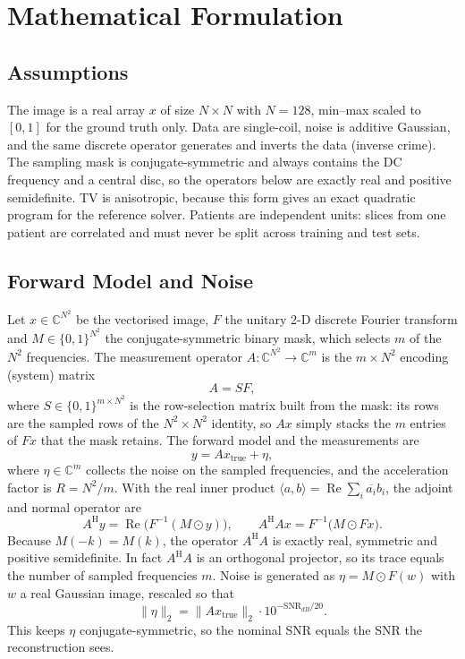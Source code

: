 \documentclass[conference,a4paper]{IEEEtran}
\newcommand{\AH}{A^{\mathrm{H}}}
\begin{document}
\section{Mathematical Formulation}

\subsection{Assumptions}
The image is a real array $x$ of size $N\times N$ with $N=128$, min--max scaled to $[0,1]$ for the ground truth only. Data are single-coil, noise is additive Gaussian, and the same discrete operator generates and inverts the data (inverse crime). The sampling mask is conjugate-symmetric and always contains the DC frequency and a central disc, so the operators below are exactly real and positive semidefinite. TV is anisotropic, because this form gives an exact quadratic program for the reference solver. Patients are independent units: slices from one patient are correlated and must never be split across training and test sets.

\subsection{Forward Model and Noise}\label{sec:forward}
Let $x\in\mathbb{C}^{N^2}$ be the vectorised image, $F$ the unitary 2-D discrete Fourier transform and $M\in\{0,1\}^{N^2}$ the conjugate-symmetric binary mask, which selects $m$ of the $N^2$ frequencies. The measurement operator $A:\mathbb{C}^{N^2}\to\mathbb{C}^{m}$ is the $m\times N^2$ encoding (system) matrix
\begin{equation}
A = S F ,
\end{equation}
where $S\in\{0,1\}^{m\times N^2}$ is the row-selection matrix built from the mask: its rows are the sampled rows of the $N^2\times N^2$ identity, so $Ax$ simply stacks the $m$ entries of $Fx$ that the mask retains. The forward model and the measurements are
\begin{equation}
y = Ax_{\mathrm{true}}+\eta ,
\end{equation}
where $\eta\in\mathbb{C}^{m}$ collects the noise on the sampled frequencies, and the acceleration factor is $R=N^2/m$. With the real inner product $\langle a,b\rangle=\operatorname{Re}\sum_i \overline{a_i}b_i$, the adjoint and normal operator are
\begin{equation}
\AH y=\operatorname{Re}\!\big(F^{-1}(M\odot y)\big), \qquad
\AH A x=F^{-1}\big(M\odot Fx\big).
\end{equation}
Because $M(-k)=M(k)$, the operator $\AH A$ is exactly real, symmetric and positive semidefinite. In fact $\AH A$ is an orthogonal projector, so its trace equals the number of sampled frequencies $m$. Noise is generated as $\eta=M\odot F(w)$ with $w$ a real Gaussian image, rescaled so that
\begin{equation}
\|\eta\|_2=\|Ax_{\mathrm{true}}\|_2\cdot 10^{-\mathrm{SNR}_{dB}/20}.
\end{equation}
This keeps $\eta$ conjugate-symmetric, so the nominal SNR equals the SNR the reconstruction sees.
\end{document}
